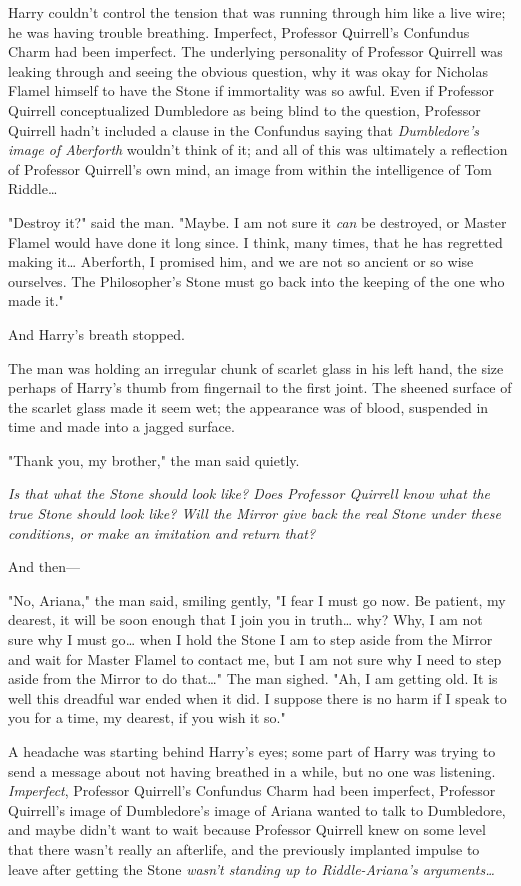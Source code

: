 Harry couldn't control the tension that was running through him like a live
wire; he was having trouble breathing. Imperfect, Professor Quirrell's
Confundus Charm had been imperfect. The underlying personality of Professor
Quirrell was leaking through and seeing the obvious question, why it was okay
for Nicholas Flamel himself to have the Stone if immortality was so awful. Even
if Professor Quirrell conceptualized Dumbledore as being blind to the question,
Professor Quirrell hadn't included a clause in the Confundus saying that
\emph{Dumbledore's image of Aberforth} wouldn't think of it; and all of this
was ultimately a reflection of Professor Quirrell's own mind, an image from
within the intelligence of Tom Riddle{\ldots}

"Destroy it?" said the man. "Maybe. I am not sure it \emph{can} be destroyed,
or Master Flamel would have done it long since. I think, many times, that he
has regretted making it{\ldots} Aberforth, I promised him, and we are not so
ancient or so wise ourselves. The Philosopher's Stone must go back into the
keeping of the one who made it."

And Harry's breath stopped.

The man was holding an irregular chunk of scarlet glass in his left hand, the
size perhaps of Harry's thumb from fingernail to the first joint. The sheened
surface of the scarlet glass made it seem wet; the appearance was of blood,
suspended in time and made into a jagged surface.

"Thank you, my brother," the man said quietly.

\emph{Is that what the Stone should look like? Does Professor Quirrell know
what the true Stone should look like? Will the Mirror give back the real Stone
under these conditions, or make an imitation and return that?}

And then---

"No, Ariana," the man said, smiling gently, "I fear I must go now. Be patient,
my dearest, it will be soon enough that I join you in truth{\ldots} why? Why, I
am not sure why I must go{\ldots} when I hold the Stone I am to step aside from
the Mirror and wait for Master Flamel to contact me, but I am not sure why I
need to step aside from the Mirror to do that{\ldots}" The man sighed. "Ah, I
am getting old. It is well this dreadful war ended when it did. I suppose there
is no harm if I speak to you for a time, my dearest, if you wish it so."

A headache was starting behind Harry's eyes; some part of Harry was trying to
send a message about not having breathed in a while, but no one was listening.
\emph{ Imperfect}, Professor Quirrell's Confundus Charm had been imperfect,
Professor Quirrell's image of Dumbledore's image of Ariana wanted to talk to
Dumbledore, and maybe didn't want to wait because Professor Quirrell knew on
some level that there wasn't really an afterlife, and the previously implanted
impulse to leave after getting the Stone \emph{wasn't standing up to
Riddle-Ariana's arguments{\ldots}}


